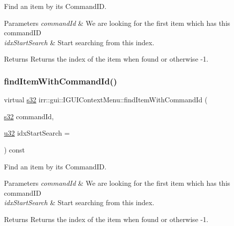 Find an item by it\textquotesingle{}s Command\+ID. 


\begin{DoxyParams}{Parameters}
{\em command\+Id} & We are looking for the first item which has this command\+ID \\
\hline
{\em idx\+Start\+Search} & Start searching from this index. \\
\hline
\end{DoxyParams}
\begin{DoxyReturn}{Returns}
Returns the index of the item when found or otherwise -\/1. 
\end{DoxyReturn}
\mbox{\label{classirr_1_1gui_1_1IGUIContextMenu_ae7b399d9940ebe566b928517aa150383}} 
\subsubsection{\texorpdfstring{find\+Item\+With\+Command\+Id()}{findItemWithCommandId()}\hspace{0.1cm}{\footnotesize\ttfamily [2/2]}}
{\footnotesize\ttfamily virtual \hyperlink{namespaceirr_ac66849b7a6ed16e30ebede579f9b47c6}{s32} irr\+::gui\+::\+I\+G\+U\+I\+Context\+Menu\+::find\+Item\+With\+Command\+Id (\begin{DoxyParamCaption}\item[{\hyperlink{namespaceirr_ac66849b7a6ed16e30ebede579f9b47c6}{s32}}]{command\+Id,  }\item[{\hyperlink{namespaceirr_a0416a53257075833e7002efd0a18e804}{u32}}]{idx\+Start\+Search = {} }\end{DoxyParamCaption}) const\hspace{0.3cm}{\ttfamily [pure virtual]}}



Find an item by it\textquotesingle{}s Command\+ID. 


\begin{DoxyParams}{Parameters}
{\em command\+Id} & We are looking for the first item which has this command\+ID \\
\hline
{\em idx\+Start\+Search} & Start searching from this index. \\
\hline
\end{DoxyParams}
\begin{DoxyReturn}{Returns}
Returns the index of the item when found or otherwise -\/1. 
\end{DoxyReturn}
\mbox{\label{classirr_1_1gui_1_1IGUIContextMenu_a5edfede62ed558acd68b06eeea0682c3}} 
